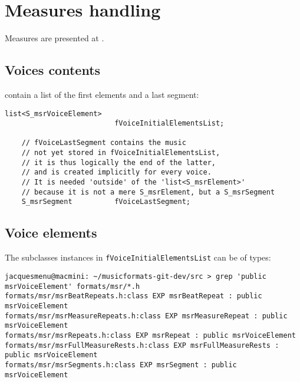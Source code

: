 
\chapter{Measures handling}\label{Measures handling}

Measures are presented at .


\section{Voices contents}

 contain a list of the first elements and a last segment:
\begin{lstlisting}[language=CPlusPlus]
    list<S_msrVoiceElement>
                          fVoiceInitialElementsList;

    // fVoiceLastSegment contains the music
    // not yet stored in fVoiceInitialElementsList,
    // it is thus logically the end of the latter,
    // and is created implicitly for every voice.
    // It is needed 'outside' of the 'list<S_msrElement>'
    // because it is not a mere S_msrElement, but a S_msrSegment
    S_msrSegment          fVoiceLastSegment;
\end{lstlisting}


\section{Voice elements}

The  subclasses instances in {\tt fVoiceInitialElementsList} can be of types:
\begin{lstlisting}[language=Terminal]
jacquesmenu@macmini: ~/musicformats-git-dev/src > grep 'public msrVoiceElement' formats/msr/*.h
formats/msr/msrBeatRepeats.h:class EXP msrBeatRepeat : public msrVoiceElement
formats/msr/msrMeasureRepeats.h:class EXP msrMeasureRepeat : public msrVoiceElement
formats/msr/msrRepeats.h:class EXP msrRepeat : public msrVoiceElement
formats/msr/msrFullMeasureRests.h:class EXP msrFullMeasureRests : public msrVoiceElement
formats/msr/msrSegments.h:class EXP msrSegment : public msrVoiceElement
\end{lstlisting}

